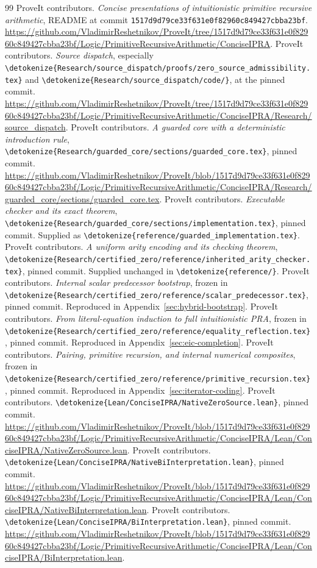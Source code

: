 \documentclass[11pt,letterpaper]{article}
\theoremstyle{definition}\newtheorem{definition}[theorem]{Definition}
\theoremstyle{remark}\newtheorem{remark}[theorem]{Remark}
\newcommand{\file}[1]{\expandafter\nolinkurl\expandafter{\detokenize{#1}}}
\begin{document}
\clearpage
\begin{thebibliography}{99}
\small
{} ProveIt contributors.
\emph{Concise presentations of intuitionistic primitive recursive arithmetic},
README at commit \texttt{1517d9d79ce33f631e0f82960c849427cbba23bf}.
\url{https://github.com/VladimirReshetnikov/ProveIt/tree/1517d9d79ce33f631e0f82960c849427cbba23bf/Logic/PrimitiveRecursiveArithmetic/ConciseIPRA}.
 ProveIt contributors.
\emph{Source dispatch}, especially
\file{Research/source_dispatch/proofs/zero_source_admissibility.tex} and
\file{Research/source_dispatch/code/}, at the pinned commit.
\url{https://github.com/VladimirReshetnikov/ProveIt/tree/1517d9d79ce33f631e0f82960c849427cbba23bf/Logic/PrimitiveRecursiveArithmetic/ConciseIPRA/Research/source_dispatch}.
 ProveIt contributors.
\emph{A guarded core with a deterministic introduction rule},
\file{Research/guarded_core/sections/guarded_core.tex}, pinned commit.
\url{https://github.com/VladimirReshetnikov/ProveIt/blob/1517d9d79ce33f631e0f82960c849427cbba23bf/Logic/PrimitiveRecursiveArithmetic/ConciseIPRA/Research/guarded_core/sections/guarded_core.tex}.
 ProveIt contributors.
\emph{Executable checker and its exact theorem},
\file{Research/guarded_core/sections/implementation.tex}, pinned commit.
Supplied as \file{reference/guarded_implementation.tex}.
 ProveIt contributors.
\emph{A uniform arity encoding and its checking theorem},
\file{Research/certified_zero/reference/inherited_arity_checker.tex},
pinned commit. Supplied unchanged in \file{reference/}.
 ProveIt contributors.
\emph{Internal scalar predecessor bootstrap}, frozen in
\file{Research/certified_zero/reference/scalar_predecessor.tex},
pinned commit. Reproduced in Appendix~\ref{sec:hybrid-bootstrap}.
 ProveIt contributors.
\emph{From literal-equation induction to full intuitionistic PRA}, frozen
in \file{Research/certified_zero/reference/equality_reflection.tex},
pinned commit. Reproduced in Appendix~\ref{sec:eic-completion}.
 ProveIt contributors.
\emph{Pairing, primitive recursion, and internal numerical composites},
frozen in \file{Research/certified_zero/reference/primitive_recursion.tex},
pinned commit. Reproduced in Appendix~\ref{sec:iterator-coding}.
 ProveIt contributors.
\file{Lean/ConciseIPRA/NativeZeroSource.lean}, pinned commit.
\url{https://github.com/VladimirReshetnikov/ProveIt/blob/1517d9d79ce33f631e0f82960c849427cbba23bf/Logic/PrimitiveRecursiveArithmetic/ConciseIPRA/Lean/ConciseIPRA/NativeZeroSource.lean}.
 ProveIt contributors.
\file{Lean/ConciseIPRA/NativeBiInterpretation.lean}, pinned commit.
\url{https://github.com/VladimirReshetnikov/ProveIt/blob/1517d9d79ce33f631e0f82960c849427cbba23bf/Logic/PrimitiveRecursiveArithmetic/ConciseIPRA/Lean/ConciseIPRA/NativeBiInterpretation.lean}.
 ProveIt contributors.
\file{Lean/ConciseIPRA/BiInterpretation.lean}, pinned commit.
\url{https://github.com/VladimirReshetnikov/ProveIt/blob/1517d9d79ce33f631e0f82960c849427cbba23bf/Logic/PrimitiveRecursiveArithmetic/ConciseIPRA/Lean/ConciseIPRA/BiInterpretation.lean}.
\end{thebibliography}
\end{document}
